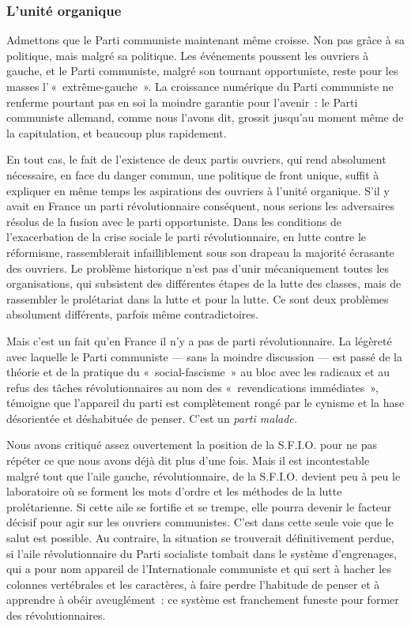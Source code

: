 \documentclass[french,twoside]{book} %
\begin{document}
\subsubsection[{L’unité organique}]{L’unité organique}
\noindent Admettons que le Parti communiste maintenant même croisse. Non pas grâce à sa politique, mais malgré sa politique. Les événements poussent les ouvriers à gauche, et le Parti communiste, malgré son tournant opportuniste, reste pour les masses l’ « extrême-gauche ». La croissance numérique du Parti communiste ne renferme pourtant pas en soi la moindre garantie pour l’avenir : le Parti communiste allemand, comme nous l’avons dit, grossit jusqu’au moment même de la capitulation, et beaucoup plus rapidement.\par
En tout cas, le fait de l’existence de deux partis ouvriers, qui rend absolument nécessaire, en face du danger commun, une politique de front unique, suffit à expliquer en même temps les aspirations des ouvriers à l’unité organique. S’il y avait en France un parti révolutionnaire conséquent, nous serions les adversaires résolus de la fusion avec le parti opportuniste. Dans les conditions de l’exacerbation de la crise sociale le parti révolutionnaire, en lutte contre le réformisme, rassemblerait infailliblement sous son drapeau la majorité écrasante des ouvriers. Le problème historique n’est pas d’unir mécaniquement toutes les organisations, qui subsistent des différentes étapes de la lutte des classes, mais de rassembler le prolétariat dans la lutte et pour la lutte. Ce sont deux problèmes absolument différents, parfois même contradictoires.\par
Mais c’est un fait qu’en France il n’y a pas de parti révolutionnaire. La légèreté avec laquelle le Parti communiste — sans la moindre discussion — est passé de la  théorie et de la pratique du « social-fascisme » au bloc avec les radicaux et au refus des tâches révolutionnaires au nom des « revendications immédiates », témoigne que l’appareil du parti est complètement rongé par le cynisme et la hase désorientée et déshabituée de penser. C’est un \emph{parti malade.}\par
Nous avons critiqué assez ouvertement la position de la S.F.I.O. pour ne pas répéter ce que nous avons déjà dit plus d’une fois. Mais il est incontestable malgré tout que l’aile gauche, révolutionnaire, de la S.F.I.O. devient peu à peu le laboratoire où se forment les mots d’ordre et les méthodes de la lutte prolétarienne. Si cette aile se fortifie et se trempe, elle pourra devenir le facteur décisif pour agir sur les ouvriers communistes. C’est dans cette seule voie que le salut est possible. Au contraire, la situation se trouverait définitivement perdue, si l’aile révolutionnaire du Parti socialiste tombait dans le système d’engrenages, qui a pour nom appareil de l’Internationale communiste et qui sert à hacher les colonnes vertébrales et les caractères, à faire perdre l’habitude de penser et à apprendre à obéir aveuglément : ce système est franchement funeste pour former des révolutionnaires.\par
\end{document}
